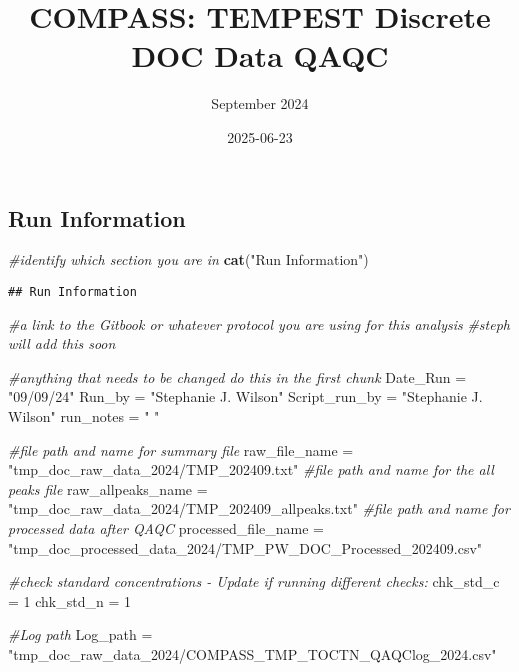 \documentclass[
]{article}
\title{COMPASS: TEMPEST Discrete DOC Data QAQC}
\author{September 2024}
\date{2025-06-23}
\newenvironment{Shaded}{\begin{snugshade}}{\end{snugshade}}
\newcommand{\CommentTok}[1]{\textcolor[rgb]{0.56,0.35,0.01}{\textit{#1}}}
\newcommand{\DecValTok}[1]{\textcolor[rgb]{0.00,0.00,0.81}{#1}}
\newcommand{\FunctionTok}[1]{\textcolor[rgb]{0.13,0.29,0.53}{\textbf{#1}}}
\newcommand{\NormalTok}[1]{#1}
\newcommand{\OtherTok}[1]{\textcolor[rgb]{0.56,0.35,0.01}{#1}}
\newcommand{\StringTok}[1]{\textcolor[rgb]{0.31,0.60,0.02}{#1}}
\begin{document}
\maketitle

\hypertarget{run-information}{%
\subsection{Run Information}\label{run-information}}

\begin{Shaded}
\begin{Highlighting}[]
\CommentTok{\#identify which section you are in }
\FunctionTok{cat}\NormalTok{(}\StringTok{"Run Information"}\NormalTok{)}
\end{Highlighting}
\end{Shaded}

\begin{verbatim}
## Run Information
\end{verbatim}

\begin{Shaded}
\begin{Highlighting}[]
\CommentTok{\#a link to the Gitbook or whatever protocol you are using for this analysis }
  \CommentTok{\#steph will add this soon }
  
\CommentTok{\#anything that needs to be changed do this in the first chunk}
\NormalTok{  Date\_Run }\OtherTok{=} \StringTok{"09/09/24"}
\NormalTok{  Run\_by }\OtherTok{=} \StringTok{"Stephanie J. Wilson"}
\NormalTok{  Script\_run\_by }\OtherTok{=} \StringTok{"Stephanie J. Wilson"}
\NormalTok{  run\_notes }\OtherTok{=} \StringTok{" "}
  
  \CommentTok{\#file path and name for summary file }
\NormalTok{    raw\_file\_name }\OtherTok{=} \StringTok{"tmp\_doc\_raw\_data\_2024/TMP\_202409.txt"} 
  \CommentTok{\#file path and name for the all peaks file }
\NormalTok{    raw\_allpeaks\_name }\OtherTok{=} \StringTok{"tmp\_doc\_raw\_data\_2024/TMP\_202409\_allpeaks.txt"}
  \CommentTok{\#file path and name for processed data after QAQC}
\NormalTok{    processed\_file\_name }\OtherTok{=} \StringTok{"tmp\_doc\_processed\_data\_2024/TMP\_PW\_DOC\_Processed\_202409.csv"}

\CommentTok{\#check standard concentrations {-} Update if running different checks: }
\NormalTok{   chk\_std\_c }\OtherTok{=} \DecValTok{1}
\NormalTok{   chk\_std\_n }\OtherTok{=} \DecValTok{1}
    
\CommentTok{\#Log path }
\NormalTok{    Log\_path }\OtherTok{=} \StringTok{"tmp\_doc\_raw\_data\_2024/COMPASS\_TMP\_TOCTN\_QAQClog\_2024.csv"}
\end{Highlighting}
\end{Shaded}
\end{document}
